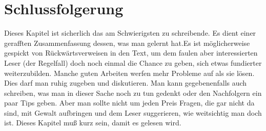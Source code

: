 \chapter{ Schlussfolgerung }
Dieses Kapitel ist sicherlich das am Schwierigsten zu schreibende. Es dient einer gerafften Zusammenfassung dessen, was man gelernt hat.Es ist möglicherweise gespickt von Rückwärtsverweisen in den Text, um dem faulen aber interessierten Leser (der Regelfall) doch noch einmal die Chance zu geben, sich etwas fundierter weiterzubilden. Manche guten Arbeiten werfen mehr Probleme auf als sie lösen. Dies darf man ruhig zugeben und diskutieren. Man kann gegebenenfalls auch schreiben, was man in dieser Sache noch zu tun gedenkt oder den Nachfolgern ein paar Tips geben. Aber man sollte nicht um jeden Preis Fragen, die gar nicht da sind, mit Gewalt aufbringen und dem Leser suggerieren, wie weitsichtig man doch ist. Dieses Kapitel muß kurz sein, damit es gelesen wird.
